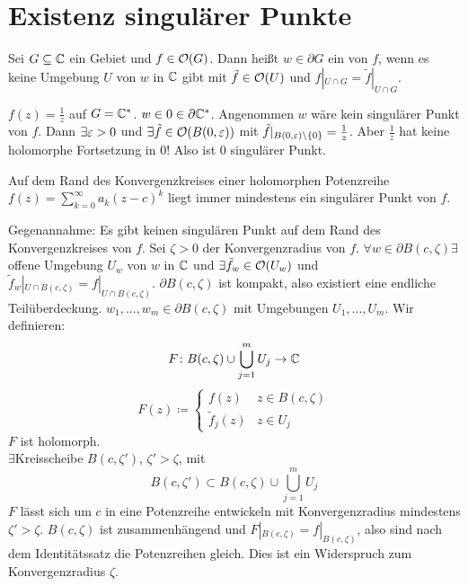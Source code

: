 \section{Existenz singul\"arer Punkte}
\begin{definition}
	Sei $ G\subseteq\mathbb{C} $ ein Gebiet und $ f\in\mathcal O(G) $. Dann hei\ss t $ w\in\partial G $ ein  von $ f $, wenn es keine Umgebung $ U $ von $ w $ in $ \mathbb{C} $ gibt mit $ \tilde f\in\mathcal O(U) $ und $ f|_{U\cap G}=\tilde{f}|_{U\cap G} $.
\end{definition}
\begin{beispiel*}
	$ f(z)=\frac{1}{z} $ auf $ G=\mathbb{C}^\ast $. $ w\in 0\in\partial\mathbb{C}^\ast $. Angenommen $ w $ w\"are kein singul\"arer Punkt von $ f $. Dann $ \exists \varepsilon>0 $ und $ \exists\tilde f\in\mathcal O(B(0,\varepsilon)) $ mit $ \tilde f|_{B(0,\varepsilon)\setminus\lbrace 0\rbrace}=\frac{1}{z} $. Aber $ \frac{1}{z} $ hat keine holomorphe Fortsetzung in $ 0 $! Also ist $ 0 $ singul\"arer Punkt.
\end{beispiel*}
\begin{satz}
	Auf dem Rand des Konvergenzkreises einer holomorphen Potenzreihe $ f(z)=\sum_{k=0}^{\infty}a_k(z-c)^k $ liegt immer mindestens ein singul\"arer Punkt von $ f $.
\end{satz}
\begin{beweis}
	Gegenannahme: Es gibt keinen singul\"aren Punkt auf dem Rand des Konvergenzkreises von $ f $. Sei $ \zeta>0 $ der Konvergenzradius von $ f $. $ \forall w\in\partial B(c,\zeta)\exists $offene Umgebung $ U_w $ von $ w $ in $ \mathbb{C} $ und $ \exists \tilde f_w\in\mathcal O(U_w) $ und $ \tilde f_w|_{U\cap B(c,\zeta)}=f|_{U\cap B(c,\zeta)} $. $ \partial B(c,\zeta) $ ist kompakt, also existiert eine endliche Teil\"uberdeckung. $ w_1,...,w_m\in\partial B(c,\zeta) $ mit Umgebungen $ U_1,...,U_m $.
	Wir definieren:
	\[ F\colon B(c,\zeta)\cup\bigcup_{j=1}^m U_j\rightarrow\mathbb{C} \]
	\[ F(z)\coloneqq \begin{cases}
	f(z)&z\in B(c,\zeta)\\
	\tilde f_j(z)&z\in U_j
	\end{cases} \]
	$ F $ ist holomorph.\\
	$ \exists $Kreisscheibe $ B(c,\zeta') $, $ \zeta'>\zeta $, mit
	\[ B(c,\zeta')\subset B(c,\zeta)\cup\bigcup_{j=1}^m U_j \]
	$ F $ l\"asst sich um $ c $ in eine Potenzreihe entwickeln mit Konvergenzradius mindestens $ \zeta'>\zeta $. $ B(c,\zeta) $ ist zusammenh\"angend und $ F|_{B(c,\zeta)}=f|_{B(c,\zeta)} $, also sind nach dem Identit\"atssatz die Potenzreihen gleich. Dies ist ein Widerspruch zum Konvergenzradius $ \zeta $. 
\end{beweis}
